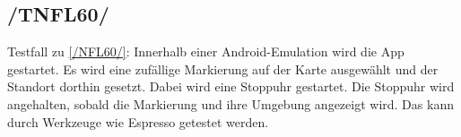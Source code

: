 \subsection*{/TNFL60/}

\label{/TNFL60/} Testfall zu \ref{/NFL60/}: Innerhalb einer \Gls{Android}-\Gls{Emulation} wird die App gestartet.
Es wird eine zufällige Markierung auf der Karte ausgewählt und der Standort dorthin gesetzt. 
Dabei wird eine Stoppuhr gestartet.
Die Stoppuhr wird angehalten, sobald die Markierung und ihre Umgebung angezeigt wird.
Das kann durch Werkzeuge wie \Gls{Espresso} getestet werden.